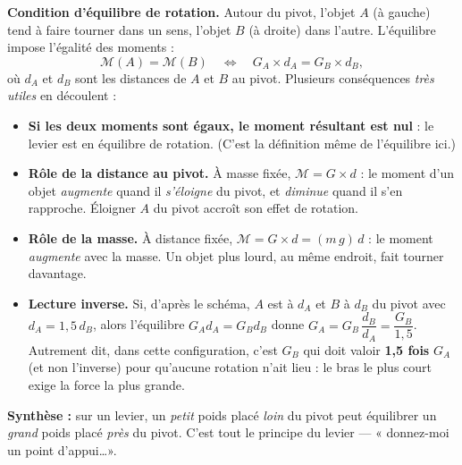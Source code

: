 \documentclass[11pt,a4paper]{article}
\newcommand{\Mom}{\mathcal{M}}      %
\begin{document}
\begin{exemple}
\textbf{Condition d'équilibre de rotation.} Autour du pivot, l'objet $A$ (à gauche) tend à faire
tourner dans un sens, l'objet $B$ (à droite) dans l'autre. L'équilibre impose l'égalité des moments :
\[
\Mom(A) = \Mom(B)\quad\Longleftrightarrow\quad G_A\times d_A = G_B\times d_B,
\]
où $d_A$ et $d_B$ sont les distances de $A$ et $B$ au pivot. Plusieurs conséquences \emph{très
utiles} en découlent :
\begin{itemize}[leftmargin=1.6em,topsep=3pt,itemsep=3pt]
  \item \textbf{Si les deux moments sont égaux, le moment résultant est nul} : le levier est en
        équilibre de rotation. (C'est la définition même de l'équilibre ici.)
  \item \textbf{Rôle de la distance au pivot.} À masse fixée, $\Mom = G\times d$ : le moment d'un
        objet \emph{augmente} quand il \emph{s'éloigne} du pivot, et \emph{diminue} quand il s'en
        rapproche. Éloigner $A$ du pivot accroît son effet de rotation.
  \item \textbf{Rôle de la masse.} À distance fixée, $\Mom = G\times d = (m\,g)\,d$ : le moment
        \emph{augmente} avec la masse. Un objet plus lourd, au même endroit, fait tourner davantage.
  \item \textbf{Lecture inverse.} Si, d'après le schéma, $A$ est à $d_A$ et $B$ à $d_B$ du pivot avec
        $d_A = 1{,}5\,d_B$, alors l'équilibre $G_A d_A = G_B d_B$ donne
        $G_A = G_B\,\dfrac{d_B}{d_A} = \dfrac{G_B}{1{,}5}$. Autrement dit, dans cette configuration,
        c'est $G_B$ qui doit valoir \textbf{1,5 fois} $G_A$ (et non l'inverse) pour qu'aucune rotation
        n'ait lieu : le bras le plus court exige la force la plus grande.
\end{itemize}
\textbf{Synthèse :} sur un levier, un \emph{petit} poids placé \emph{loin} du pivot peut équilibrer un
\emph{grand} poids placé \emph{près} du pivot. C'est tout le principe du levier — « donnez-moi un
point d'appui\dots ».
\end{exemple}

\end{document}
